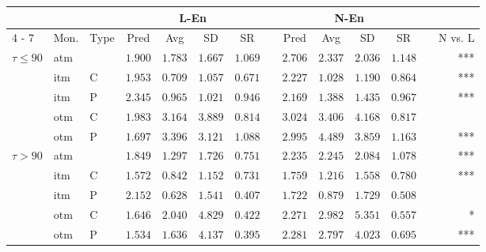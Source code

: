 \begin{tabular}{@{}lllrrrrrrrrrrr@{}}%
\toprule%
&&&\multicolumn{4}{c}{L{-}En}&&\multicolumn{4}{c}{N{-}En}&&\\%
\cmidrule{4%
-%
7}%
\cmidrule{9%
-%
12}%
\multicolumn{1}{c}{TTM}&\multicolumn{1}{c}{Mon.}&\multicolumn{1}{c}{Type}&\multicolumn{1}{c}{Pred}&\multicolumn{1}{c}{Avg}&\multicolumn{1}{c}{SD}&\multicolumn{1}{c}{SR}&\multicolumn{1}{c}{}&\multicolumn{1}{c}{Pred}&\multicolumn{1}{c}{Avg}&\multicolumn{1}{c}{SD}&\multicolumn{1}{c}{SR}&\multicolumn{1}{c}{}&\multicolumn{1}{c}{N vs. L}\\%
\midrule%
\multirow{5}{*}{$\tau \leq 90$}&atm&&$1.900$&$1.783$&$1.667$&$1.069$&&$2.706$&$2.337$&$2.036$&$1.148$&&***\\%
&itm&C&$1.953$&$0.709$&$1.057$&$0.671$&&$2.227$&$1.028$&$1.190$&$0.864$&&***\\%
&itm&P&$2.345$&$0.965$&$1.021$&$0.946$&&$2.169$&$1.388$&$1.435$&$0.967$&&***\\%
&otm&C&$1.983$&$3.164$&$3.889$&$0.814$&&$3.024$&$3.406$&$4.168$&$0.817$&&\\%
&otm&P&$1.697$&$3.396$&$3.121$&$1.088$&&$2.995$&$4.489$&$3.859$&$1.163$&&***\\%
\midrule%
\multirow{5}{*}{$\tau > 90$}&atm&&$1.849$&$1.297$&$1.726$&$0.751$&&$2.235$&$2.245$&$2.084$&$1.078$&&***\\%
&itm&C&$1.572$&$0.842$&$1.152$&$0.731$&&$1.759$&$1.216$&$1.558$&$0.780$&&***\\%
&itm&P&$2.152$&$0.628$&$1.541$&$0.407$&&$1.722$&$0.879$&$1.729$&$0.508$&&\\%
&otm&C&$1.646$&$2.040$&$4.829$&$0.422$&&$2.271$&$2.982$&$5.351$&$0.557$&&*\\%
&otm&P&$1.534$&$1.636$&$4.137$&$0.395$&&$2.281$&$2.797$&$4.023$&$0.695$&&***\\\bottomrule%
%
\end{tabular}
